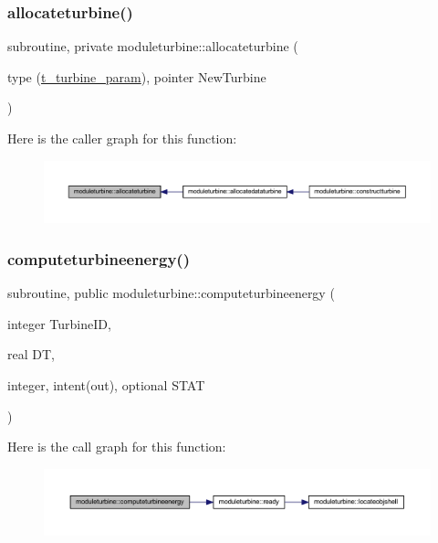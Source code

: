 \subsubsection{\texorpdfstring{allocateturbine()}{allocateturbine()}}
{\footnotesize\ttfamily subroutine, private moduleturbine\+::allocateturbine (\begin{DoxyParamCaption}\item[{type (\mbox{\hyperlink{structmoduleturbine_1_1t__turbine__param}{t\+\_\+turbine\+\_\+param}}), pointer}]{New\+Turbine }\end{DoxyParamCaption})\hspace{0.3cm}{\ttfamily [private]}}

Here is the caller graph for this function\+:\nopagebreak
\begin{figure}[H]
\begin{center}
\leavevmode
\includegraphics[width=350pt]{namespacemoduleturbine_a256dbbfda7b4fd109ab1088e055e3bd0_icgraph}
\end{center}
\end{figure}
\mbox{\label{namespacemoduleturbine_a35c07aae7c495f5bff14bf45e5811a6e}} 
\subsubsection{\texorpdfstring{computeturbineenergy()}{computeturbineenergy()}}
{\footnotesize\ttfamily subroutine, public moduleturbine\+::computeturbineenergy (\begin{DoxyParamCaption}\item[{integer}]{Turbine\+ID,  }\item[{real}]{DT,  }\item[{integer, intent(out), optional}]{S\+T\+AT }\end{DoxyParamCaption})}

Here is the call graph for this function\+:\nopagebreak
\begin{figure}[H]
\begin{center}
\leavevmode
\includegraphics[width=350pt]{namespacemoduleturbine_a35c07aae7c495f5bff14bf45e5811a6e_cgraph}
\end{center}
\end{figure}
\mbox{\label{namespacemoduleturbine_a9771605ad11401e5f01589b0db35b8f2}} 
